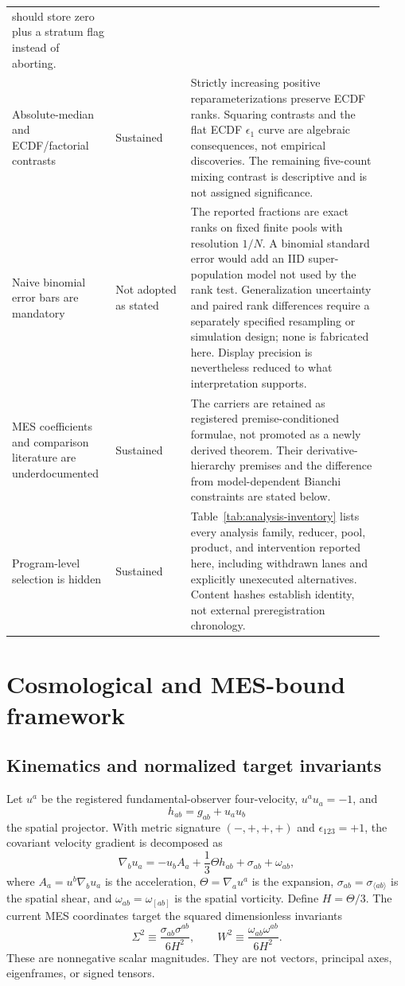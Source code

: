\documentclass[11pt,a4paper]{article}
\begin{document}
\begin{longtable}{@{}p{0.25\linewidth}p{0.19\linewidth}p{0.49\linewidth}@{}}
should store zero plus a stratum flag instead of aborting.\\
Absolute-median and ECDF/factorial contrasts & Sustained & Strictly increasing
positive reparameterizations preserve ECDF ranks.  Squaring contrasts and the
flat ECDF $\epsilon_1$ curve are algebraic consequences, not empirical
discoveries.  The remaining five-count mixing contrast is descriptive and is
not assigned significance.\\
Naive binomial error bars are mandatory & Not adopted as stated & The reported
fractions are exact ranks on fixed finite pools with resolution $1/N$.
A binomial standard error would add an IID super-population model not used by
the rank test.  Generalization uncertainty and paired rank differences require
a separately specified resampling or simulation design; none is fabricated
here.  Display precision is nevertheless reduced to what interpretation
supports.\\
MES coefficients and comparison literature are underdocumented & Sustained &
The carriers are retained as registered premise-conditioned formulae, not
promoted as a newly derived theorem.  Their derivative-hierarchy premises and
the difference from model-dependent Bianchi constraints are stated below.\\
Program-level selection is hidden & Sustained & Table~\ref{tab:analysis-inventory}
lists every analysis family, reducer, pool, product, and intervention reported
here, including withdrawn lanes and explicitly unexecuted alternatives.
Content hashes establish identity, not external preregistration chronology.\\
\bottomrule
\end{longtable}

\section{Cosmological and MES-bound framework}

\subsection{Kinematics and normalized target invariants}

Let $u^a$ be the registered fundamental-observer four-velocity,
$u^au_a=-1$, and
\[
h_{ab}=g_{ab}+u_au_b
\]
the spatial projector.  With metric signature $(-,+,+,+)$ and
$\epsilon_{123}=+1$, the covariant velocity gradient is decomposed as
\[
\nabla_bu_a=-u_bA_a+\frac{1}{3}\Theta h_{ab}
 +\sigma_{ab}+\omega_{ab},
\]
where $A_a=u^b\nabla_bu_a$ is the acceleration, $\Theta=\nabla_au^a$ is the
expansion, $\sigma_{ab}=\sigma_{\langle ab\rangle}$ is the spatial shear, and
$\omega_{ab}=\omega_{[ab]}$ is the spatial vorticity.  Define $H=\Theta/3$.
The current MES coordinates target the squared dimensionless invariants
\begin{equation}
\Sigma^2\equiv\frac{\sigma_{ab}\sigma^{ab}}{6H^2},
\qquad
W^2\equiv\frac{\omega_{ab}\omega^{ab}}{6H^2}.
\label{eq:physical-invariants}
\end{equation}
These are nonnegative scalar magnitudes.  They are not vectors, principal
axes, eigenframes, or signed tensors.
\end{document}
